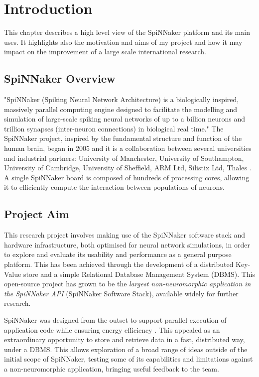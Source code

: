 \chapter{Introduction}
\label{cha:intro}

This chapter describes a high level view of the SpiNNaker platform and its main uses. It highlights also the motivation and aims of my project and how it may impact on the improvement of a large scale international research.

\section{SpiNNaker Overview}
\label{sec:overview}

"SpiNNaker (Spiking Neural Network Architecture) is a biologically inspired, massively parallel computing engine designed to facilitate the modelling and simulation of large-scale spiking neural networks of up to a billion neurons and trillion synapses (inter-neuron connections) in biological real time." \cite{painkras} The SpiNNaker project, inspired by the fundamental structure and function of the human brain, began in 2005 and it is a collaboration between several universities and industrial partners: University of Manchester, University of Southampton, University of Cambridge, University of Sheffield, ARM Ltd, Silistix Ltd, Thales \cite{spinnproject}. A single SpiNNaker board is composed of hundreds of processing cores, allowing it to efficiently compute the interaction between populations of neurons.

\section{Project Aim}
\label{sec:aim}

This research project involves making use of the SpiNNaker software stack and hardware infrastructure, both optimised for neural network simulations, in order to explore and evaluate its usability and performance as a general purpose platform. This has been achieved through the development of a distributed Key-Value store and a simple Relational Database Management System (DBMS). This open-source project has grown to be the \textit{largest non-neuromorphic application in the SpiNNaker API} (SpiNNaker Software Stack), available widely for further research.

SpiNNaker was designed from the outset to support parallel execution of application code while ensuring energy efficiency \cite{discrete}. This appealed as an extraordinary opportunity to store and retrieve data in a fast, distributed way, under a DBMS. This allows exploration of a broad range of ideas outside of the initial scope of SpiNNaker, testing some of its capabilities and limitations against a non-neuromorphic application, bringing useful feedback to the team.

